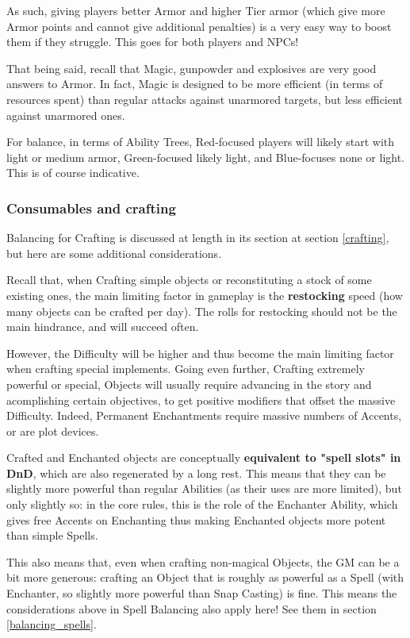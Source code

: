 As such, giving players better Armor and higher Tier armor (which give more Armor points and cannot give additional penalties) is a very easy way to boost them if they struggle. This goes for both players and NPCs!

That being said, recall that Magic, gunpowder and explosives are very good answers to Armor. In fact, Magic is designed to be more efficient (in terms of resources spent) than regular attacks against unarmored targets, but less efficient against unarmored ones.

For balance, in terms of Ability Trees, Red-focused players will likely start with light or medium armor, Green-focused likely light, and Blue-focuses none or light. This is of course indicative.


\subsubsection{Consumables and crafting}

Balancing for Crafting is discussed at length in its section at section \ref{crafting}, but here are some additional considerations.

Recall that, when Crafting simple objects or reconstituting a stock of some existing ones, the main limiting factor in gameplay is the \textbf{restocking} speed (how many objects can be crafted per day). The rolls for restocking should not be the main hindrance, and will succeed often.

However, the Difficulty will be higher and thus become the main limiting factor when crafting special implements. Going even further, Crafting extremely powerful or special, Objects will usually require advancing in the story and acomplishing certain objectives, to get positive modifiers that offset the massive Difficulty. Indeed, Permanent Enchantments require massive numbers of Accents, or are plot devices.

\label{balancing_crafting}

Crafted and Enchanted objects are conceptually \textbf{equivalent to "spell slots" in DnD}, which are also regenerated by a long rest. This means that they can be slightly more powerful than regular Abilities (as their uses are more limited), but only slightly so: in the core rules, this is the role of the Enchanter Ability, which gives free Accents on Enchanting thus making Enchanted objects more potent than simple Spells.

This also means that, even when crafting non-magical Objects, the GM can be a bit more generous: crafting an Object that is roughly as powerful as a Spell (with Enchanter, so slightly more powerful than Snap Casting) is fine. This means the considerations above in Spell Balancing also apply here! See them in section \ref{balancing_spells}.


